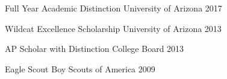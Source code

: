 \vspace{-0.5cm}

\begin{multicols}{2}
\begin{cvhonors}
  \cvhonor
    {Full Year Academic Distinction} %
    {University of Arizona} %
    {} %
    {2017} %

  \cvhonor
    {Wildcat Excellence Scholarship} %
    {University of Arizona} %
    {} %
    {2013} %

%
%
\end{cvhonors}

\begin{cvhonors}
%
%
  \cvhonor
    {AP Scholar with Distinction} %
    {College Board} %
    {} %
    {2013} %

  \cvhonor
    {Eagle Scout} %
    {Boy Scouts of America} %
    {} %
    {2009} %

\end{cvhonors}
\end{multicols}
\vspace{-0.5cm}
